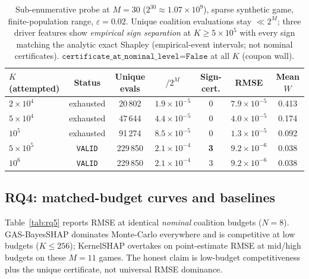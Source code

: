 \documentclass[preprint,12pt]{elsarticle}
\begin{document}
\begin{table}[htbp]\centering\small
\caption{Sub-enumerative probe at $M{=}30$ ($2^{30}\approx1.07\times10^9$), sparse synthetic game, finite-population range, $\varepsilon{=}0.02$. Unique coalition evaluations stay $\ll2^M$; three driver features show \emph{empirical sign separation} at $K{\ge}5\times10^5$ with every sign matching the analytic exact Shapley (empirical-event intervals; not nominal certificates). $\texttt{certificate\_at\_nominal\_level=False}$ at all $K$ (coupon wall).}
\label{tab:highdim}
\begin{tabular}{lcccccc}
\toprule
$K$ (attempted) & Status & Unique evals & $/2^M$ & Sign-cert. & RMSE & Mean $W$ \\
\midrule
$2\times10^4$ & exhausted & 20\,802 & $1.9\times10^{-5}$ & 0 & $7.9\times10^{-5}$ & 0.413 \\
$5\times10^4$ & exhausted & 47\,644 & $4.4\times10^{-5}$ & 0 & $4.0\times10^{-5}$ & 0.174 \\
$10^5$ & exhausted & 91\,274 & $8.5\times10^{-5}$ & 0 & $1.3\times10^{-5}$ & 0.092 \\
$5\times10^5$ & \texttt{VALID} & 229\,850 & $2.1\times10^{-4}$ & \textbf{3} & $9.2\times10^{-6}$ & 0.038 \\
$10^6$ & \texttt{VALID} & 229\,850 & $2.1\times10^{-4}$ & 3 & $9.2\times10^{-6}$ & 0.038 \\
\bottomrule
\end{tabular}
\end{table}

\subsection{RQ4: matched-budget curves and baselines}\label{sec:rq4}

Table~\ref{tab:rq5} reports RMSE at identical \emph{nominal} coalition budgets ($N=8$). GAS-BayesSHAP dominates Monte-Carlo everywhere and is competitive at low budgets ($K\le256$); KernelSHAP overtakes on point-estimate RMSE at mid/high budgets on these $M=11$ games. The honest claim is low-budget competitiveness plus the unique certificate, not universal RMSE dominance.
\end{document}
